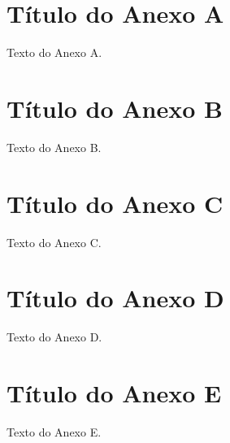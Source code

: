
\begin{anexosenv}
	
	\partanexos
	
	\chapter{Título do Anexo A}
	
	Texto do Anexo A.
	
	
	
	\chapter{Título do Anexo B}
	
	Texto do Anexo B.
	
	
	
	\chapter{Título do Anexo C}
	
	Texto do Anexo C.
	
	
	
	\chapter{Título do Anexo D}
	
	Texto do Anexo D.
	
	
	
	\chapter{Título do Anexo E}
	
	Texto do Anexo E.
	
	
	
\end{anexosenv}